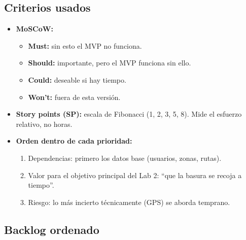 \documentclass[11pt,a4paper]{article}
\begin{document}
\subsection{Criterios usados}

\begin{itemize}
  \item \textbf{MoSCoW:}
  \begin{itemize}
    \item \textbf{Must:} sin esto el MVP no funciona.
    \item \textbf{Should:} importante, pero el MVP funciona sin ello.
    \item \textbf{Could:} deseable si hay tiempo.
    \item \textbf{Won't:} fuera de esta versión.
  \end{itemize}
  \item \textbf{Story points (SP):} escala de Fibonacci (1, 2, 3, 5, 8). Mide el esfuerzo relativo, no horas.
  \item \textbf{Orden dentro de cada prioridad:}
  \begin{enumerate}
    \item Dependencias: primero los datos base (usuarios, zonas, rutas).
    \item Valor para el objetivo principal del Lab 2: ``que la basura se recoja a tiempo''.
    \item Riesgo: lo más incierto técnicamente (GPS) se aborda temprano.
  \end{enumerate}
\end{itemize}

\subsection{Backlog ordenado}
\end{document}
